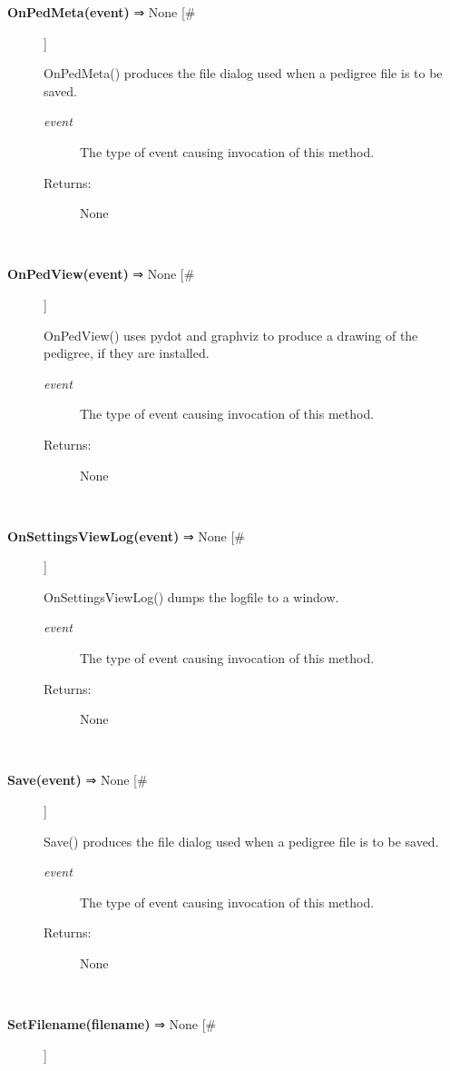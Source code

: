 \begin{description}
\item[\textbf{OnPedMeta(event)}
 ⇒ None [\#]]

 OnPedMeta() produces the file dialog used when a pedigree file is to be saved.
\begin{description}
\item[\emph{event}
] The type of event causing invocation of this method.
\item[Returns:] None

\end{description}
\\ 

\item[\textbf{OnPedView(event)}
 ⇒ None [\#]]

 OnPedView() uses pydot and graphviz to produce a drawing of the pedigree, if they are installed.
\begin{description}
\item[\emph{event}
] The type of event causing invocation of this method.
\item[Returns:] None

\end{description}
\\ 

\item[\textbf{OnSettingsViewLog(event)}
 ⇒ None [\#]]

 OnSettingsViewLog() dumps the logfile to a window.
\begin{description}
\item[\emph{event}
] The type of event causing invocation of this method.
\item[Returns:] None

\end{description}
\\ 

\item[\textbf{Save(event)}
 ⇒ None [\#]]

 Save() produces the file dialog used when a pedigree file is to be saved.
\begin{description}
\item[\emph{event}
] The type of event causing invocation of this method.
\item[Returns:] None

\end{description}
\\ 

\item[\textbf{SetFilename(filename)}
 ⇒ None [\#]]


\end{description}
